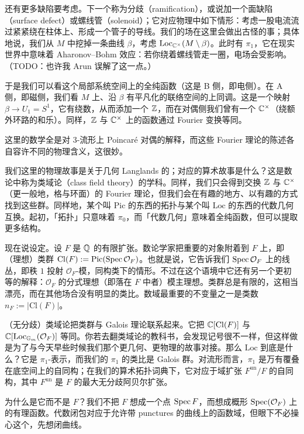 还有更多缺陷要考虑。下一个称为分歧（ramification），或说加一个面缺陷（surface defect）或螺线管（solenoid）；它对应物理中如下情形：考虑一股电流流过紧紧绕在柱体上、形成一个管子的导线。我们的场在这里会做出古怪的事；具体地说，我们从 $M$ 中挖掉一条曲线 $\beta$，考虑 $\mathrm{Loc}_{\mathbb{C}^\times}(M\setminus\beta)$。此时有 $\pi_1$，它在现实世界中意味着 Aharonov--Bohm 效应：若你绕着螺线管走一圈，电场会受影响。（TODO：也许我 Arun 误解了这一点。）

于是我们可以看这个局部系统空间上的全纯函数（这是 B 侧，即电侧）。在 A 侧，即磁侧，我们看 $M$ 上、沿 $\beta$ 有平凡化的联络空间的上同调。这是一个映射 $\beta\to U_1 = S^1$，它有绕数，从而添加一个 $\mathbb{Z}$，而在对偶侧我们曾有一个 $\mathbb{C}^\times$（绕额外环路的和乐）。同样，$\mathbb{Z}$ 与 $\mathbb{C}^\times$ 上的函数通过 Fourier 变换等同。

这里的数学全是对 $3$-流形上 Poincaré 对偶的解释，而这些 Fourier 理论的陈述各自容许不同的物理含义，这很妙。

我们这里的物理故事是关于几何 Langlands 的；对应的算术故事是什么？这是数论中称为类域论（class field theory）的学科。同样，我们只会得到交换 $\mathbb{Z}$ 与 $\mathbb{C}^\times$（更一般地，格与环面）的 Fourier 理论，但我们会在有趣的地方、以有趣的方式找到这些群。同样地，某个叫 $\mathrm{Pic}$ 的东西的拓扑与某个叫 $\mathrm{Loc}$ 的东西的代数几何互换。起初，「拓扑」只意味着 $\pi_0$，而「代数几何」意味着全纯函数，但可以提取更多结构。

现在说设定。设 $F$ 是 $\mathbb{Q}$ 的有限扩张。数论学家把重要的对象附着到 $F$ 上，即（理想）类群 $\mathrm{Cl}(F) := \operatorname{Pic}(\operatorname{Spec}\mathcal{O}_F)$。也就是说，它告诉我们 $\operatorname{Spec}\mathcal{O}_F$ 上的线丛，即秩 $1$ 投射 $\mathcal{O}_F$-模，同构类下的情形。不过在这个语境中它还有另一个更初等的解释：$\mathcal{O}_F$ 的分式理想（即落在 $F$ 中者）模主理想。类群总是有限的，这相当漂亮，而在其他场合没有明显的类比。数域最重要的不变量之一是类数 $n_F := |\mathrm{Cl}(F)|$。

（无分歧）类域论把类群与 Galois 理论联系起来。它把 $\mathbb{C}[\mathrm{Cl}(F)]$ 与 $\mathbb{C}[\mathrm{Loc}_{\mathbb{G}_m}(\mathcal{O}_F)]$ 等同。你若去翻类域论的教科书，会发现记号很不一样，但这样做是为了与今天早些时候我们那个更几何、更物理的故事对接。那么 $\mathrm{Loc}$ 到底是什么？它是 $\pi_1$-表示，而我们的 $\pi_1$ 的类比是 Galois 群。对流形而言，$\pi_1$ 是万有覆叠在底空间上的自同构；在我们的算术拓扑词典下，它对应于域扩张 $F^{\mathrm{un}}/F$ 的自同构，其中 $F^{\mathrm{un}}$ 是 $F$ 的最大无分歧阿贝尔扩张。

为什么是它而不是 $F$？我们不把 $F$ 想成一个点 $\operatorname{Spec} F$，而想成概形 $\operatorname{Spec}(\mathcal{O}_F)$ 上的有理函数。代数闭包对应于允许带 punctures 的曲线上的函数域，但眼下不必操心这个，先想闭曲线。

